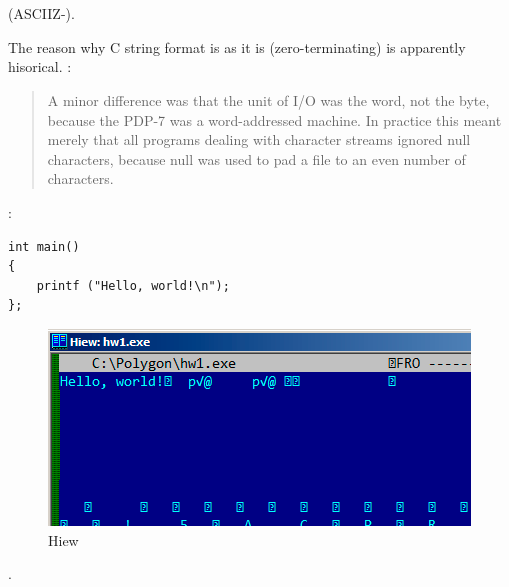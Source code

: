 \section{}

\label{C_strings}
(\ac{ASCIIZ}-).

{The reason why C string format is as it is (zero-terminating) is apparently hisorical}.
 \cite{Ritchie79} :

\begin{framed}
\begin{quotation}
A minor difference was that the unit of I/O was the word, not the byte, because the PDP-7 was a word-addressed
machine. In practice this meant merely that all programs dealing with character streams ignored null
characters, because null was used to pad a file to an even number of characters.
\end{quotation}
\end{framed}

:

\begin{lstlisting}
int main()
{
	printf ("Hello, world!\n");
};
\end{lstlisting}

\begin{figure}[H]
\centering
\includegraphics[scale=0.66]{other/strings/C-string.png}
\caption{Hiew}
\end{figure}

.


